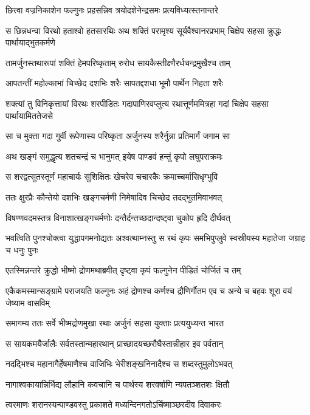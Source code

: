 \twolineshloka
{छित्त्वा वज्रनिकाशेन फल्गुनः प्रहसन्निव}
{त्रयोदशेनेन्द्रसमः प्रत्यविध्यत्स्तनान्तरे}


\threelineshloka
{स छिन्नधन्वा विरथो हताश्वो हतसारथिः}
{अथ शक्तिं परामृश्य सूर्यवैश्वानरप्रभाम्}
{चिक्षेप सहसा क्रुद्धः पार्थायाद्भुतकर्मणे}


\twolineshloka
{तामर्जुनस्तथारूपां शक्तिं हेमपरिष्कृताम्}
{रुरोध सायकैस्तीक्ष्णैरर्धचन्द्रमुखैश्च ताम्}


\twolineshloka
{आपतन्तीं महोल्काभां चिच्छेद दशभिः शरैः}
{सापतद्दशधा भूमौ पार्थेन निहता शरैः}


\threelineshloka
{शक्त्यां तु विनिकृत्तायां विरथः शरपीडितः}
{गदापाणिरवप्लुत्य रथात्तूर्णममित्रहा}
{गदां चिक्षेप सहसा पार्थायामिततेजसे}


\twolineshloka
{सा च मुक्ता गदा गुर्वी रूपेणास्य परिष्कृता}
{अर्जुनस्य शरैर्नुन्ना प्रतिमार्गं जगाम सा}


\twolineshloka
{अथ खङ्गं समुद्धृत्य शतचन्द्रं च भानुमत्}
{इयेष पाण्डवं हन्तुं कृपो लघुपराक्रमः}


\twolineshloka
{स शरद्वत्सुतस्तूर्णं महाचार्यः सुशिक्षितः}
{खेचरेव चचारकैः क्रमाच्चर्मासिधृग्भुवि}


\twolineshloka
{ततः क्षुरप्रैः कौन्तेयो दशभिः खङ्गचर्मणी}
{निमेषादिव चिच्छेद तदद्भुतमिवाभवत्}


\twolineshloka
{विषण्णवदमस्तत्र विनाशात्खङ्गचर्मणोः}
{दन्तैर्दन्तच्छदान्दष्ट्वा चुकोप हृदि दीर्घवत्}


\threelineshloka
{भवत्विति पुनश्चोक्त्वा युद्धापगमनोद्यतः}
{अश्वत्थाम्नस्तु स रथं कृपः समभिपुप्लुवे}
{स्वस्रीयस्य महातेजा जग्राह च धनुः पुनः}


\twolineshloka
{एतस्मिन्नन्तरे क्रुद्धो भीष्मो द्रोणमथाब्रवीत्}
{दृष्ट्वा कृपं फल्गुनेन पीडितं चोर्जितं च तम्}


\threelineshloka
{एकैकमस्मान्सङ्ग्रामे पराजयति फल्गुनः}
{अहं द्रोणश्च कर्णश्च द्रौणिर्गौतम एव च}
{अन्ये च बहवः शूरा वयं जेष्याम वासविम्}


\twolineshloka
{समागम्य ततः सर्वे भीष्मद्रोणमुखा रथाः}
{अर्जुनं सहसा युक्ताः प्रत्ययुध्यन्त भारत}


\twolineshloka
{स सायकमयैर्जालैः सर्वतस्तान्महारथान्}
{प्राच्छादयच्छरौघैस्तान्नीहार इव पर्वतान्}


\twolineshloka
{नदद्भिश्च महानागैर्हेषमाणैश्च वाजिभिः}
{भेरीशङ्खनिनादैश्च स शब्दस्तुमुलोऽभवत्}


\twolineshloka
{नागाश्वकायान्निर्भिद्य लौहानि कवचानि च}
{पार्थस्य शरवर्षाणि न्यपतञ्शतशः क्षितौ}


\twolineshloka
{त्वरमाणः शरानस्यन्पाण्डवस्तु प्रकाशते}
{मध्यन्दिनगतोऽर्चिष्माञ्छरदीव दिवाकरः}


